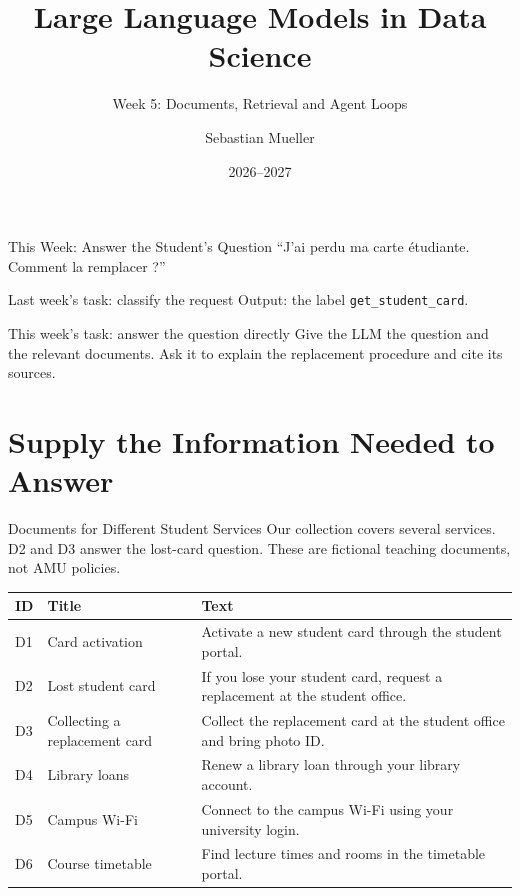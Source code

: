 \documentclass[aspectratio=169]{beamer}
\title{Large Language Models in Data Science}
\subtitle{Week 5: Documents, Retrieval and Agent Loops}
\author{Sebastian Mueller}
\institute{Aix-Marseille Universit\'e}
\date{2026--2027}
\begin{document}
\begin{frame}[plain]\titlepage\end{frame}

\begin{frame}{This Week: Answer the Student's Question}
  ``J'ai perdu ma carte étudiante. Comment la remplacer ?''
  \begin{block}{Last week's task: classify the request}
    Output: the label \texttt{get\_student\_card}.
  \end{block}
  \begin{block}{This week's task: answer the question directly}
    Give the LLM the question and the relevant documents. Ask it to explain the replacement procedure and cite its sources.
  \end{block}
\end{frame}

\section{Supply the Information Needed to Answer}

\begin{frame}{Documents for Different Student Services}
  \small Our collection covers several services. D2 and D3 answer the lost-card question. These are fictional teaching documents, not AMU policies.
  \par\vspace{0.5em}
  \renewcommand{\arraystretch}{1.15}
  \begin{tabular}{@{}p{0.7cm}>{\raggedright\arraybackslash}p{3.0cm}>{\raggedright\arraybackslash}p{8.4cm}@{}}
    \toprule
    \textbf{ID} & \textbf{Title} & \textbf{Text} \\
    \midrule
    D1 & Card activation & Activate a new student card through the student portal. \\
    D2 & Lost student card & If you lose your student card, request a replacement at the student office. \\
    D3 & Collecting a replacement card & Collect the replacement card at the student office and bring photo ID. \\
    D4 & Library loans & Renew a library loan through your library account. \\
    D5 & Campus Wi-Fi & Connect to the campus Wi-Fi using your university login. \\
    D6 & Course timetable & Find lecture times and rooms in the timetable portal. \\
    \bottomrule
  \end{tabular}
\end{frame}
\end{document}
